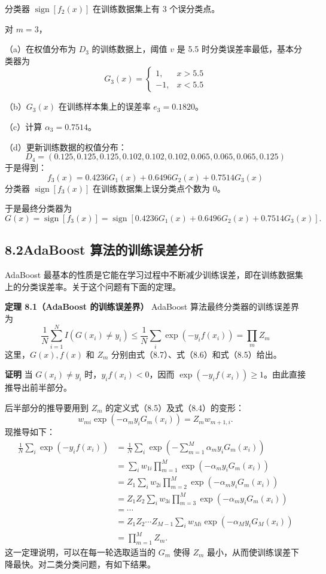 \documentclass[UTF8,12pt,a4paper,fontset=fandol]{ctexart}
\begin{document}
分类器 $\operatorname{sign}[f_2(x)]$ 在训练数据集上有 3 个误分类点。

对 $m=3$，

（a）在权值分布为 $D_3$ 的训练数据上，阈值 $v$ 是 5.5 时分类误差率最低，基本分类器为
\[
G_3(x)=
\begin{cases}
1, & x>5.5\\
-1, & x<5.5
\end{cases}
\]

（b）$G_3(x)$ 在训练样本集上的误差率 $e_3=0.1820$。

（c）计算 $\alpha_3=0.7514$。

（d）更新训练数据的权值分布：
\[
D_4=(0.125,0.125,0.125,0.102,0.102,0.102,0.065,0.065,0.065,0.125)
\]
于是得到：
\[
f_3(x)=0.4236G_1(x)+0.6496G_2(x)+0.7514G_3(x)
\]
分类器 $\operatorname{sign}[f_3(x)]$ 在训练数据集上误分类点个数为 0。

于是最终分类器为
\[
G(x)=\operatorname{sign}[f_3(x)]
=\operatorname{sign}[0.4236G_1(x)+0.6496G_2(x)+0.7514G_3(x)].
\]

\subsection*{8.2\quad AdaBoost 算法的训练误差分析}

AdaBoost 最基本的性质是它能在学习过程中不断减少训练误差，即在训练数据集上的分类误差率。关于这个问题有下面的定理。

\noindent\textbf{定理 8.1（AdaBoost 的训练误差界）}\quad
AdaBoost 算法最终分类器的训练误差界为
\begin{equation}
\frac{1}{N}\sum_{i=1}^N I(G(x_i)\ne y_i)
\leq \frac{1}{N}\sum_i \exp(-y_if(x_i))=\prod_m Z_m
\tag{8.9}
\end{equation}
这里，$G(x),f(x)$ 和 $Z_m$ 分别由式（8.7）、式（8.6）和式（8.5）给出。

\noindent\textbf{证明}\quad
当 $G(x_i)\ne y_i$ 时，$y_if(x_i)<0$，因而 $\exp(-y_if(x_i))\geq 1$。由此直接推导出前半部分。

后半部分的推导要用到 $Z_m$ 的定义式（8.5）及式（8.4）的变形：
\[
w_{mi}\exp(-\alpha_my_iG_m(x_i))=Z_mw_{m+1,i}.
\]
现推导如下：
\[
\begin{aligned}
\frac{1}{N}\sum_i \exp(-y_if(x_i))
&=\frac{1}{N}\sum_i \exp\left(-\sum_{m=1}^M \alpha_my_iG_m(x_i)\right)\\
&=\sum_i w_{1i}\prod_{m=1}^M \exp(-\alpha_my_iG_m(x_i))\\
&=Z_1\sum_i w_{2i}\prod_{m=2}^M \exp(-\alpha_my_iG_m(x_i))\\
&=Z_1Z_2\sum_i w_{3i}\prod_{m=3}^M \exp(-\alpha_my_iG_m(x_i))\\
&=\cdots\\
&=Z_1Z_2\cdots Z_{M-1}\sum_i w_{Mi}\exp(-\alpha_My_iG_M(x_i))\\
&=\prod_{m=1}^M Z_m.
\end{aligned}
\]
这一定理说明，可以在每一轮选取适当的 $G_m$ 使得 $Z_m$ 最小，从而使训练误差下降最快。对二类分类问题，有如下结果。
\end{document}

